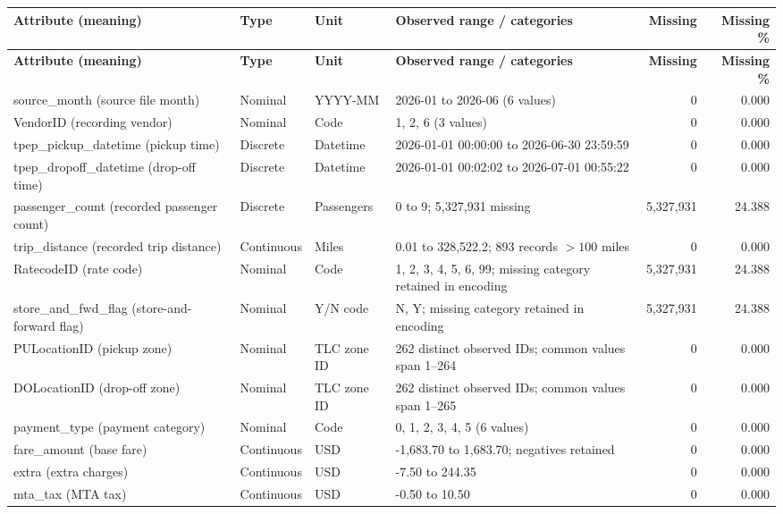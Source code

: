 \documentclass[10pt,a4paper]{article}
\begin{document}
\begin{longtable}{@{}p{3.7cm}p{1.35cm}p{1.25cm}p{6.0cm}r r@{}}
\toprule
\textbf{Attribute (meaning)} & \textbf{Type} & \textbf{Unit} & \textbf{Observed range / categories} & \textbf{Missing} & \textbf{Missing \%}\\
\midrule
\endfirsthead
\toprule
\textbf{Attribute (meaning)} & \textbf{Type} & \textbf{Unit} & \textbf{Observed range / categories} & \textbf{Missing} & \textbf{Missing \%}\\
\midrule
\endhead
\bottomrule
\endfoot
source\_month (source file month) & Nominal & YYYY-MM & 2026-01 to 2026-06 (6 values) & 0 & 0.000\\
VendorID (recording vendor) & Nominal & Code & 1, 2, 6 (3 values) & 0 & 0.000\\
tpep\_pickup\_datetime (pickup time) & Discrete & Datetime & 2026-01-01 00:00:00 to 2026-06-30 23:59:59 & 0 & 0.000\\
tpep\_dropoff\_datetime (drop-off time) & Discrete & Datetime & 2026-01-01 00:02:02 to 2026-07-01 00:55:22 & 0 & 0.000\\
passenger\_count (recorded passenger count) & Discrete & Passengers & 0 to 9; 5,327,931 missing & 5,327,931 & 24.388\\
trip\_distance (recorded trip distance) & Continuous & Miles & 0.01 to 328,522.2; 893 records $>100$ miles & 0 & 0.000\\
RatecodeID (rate code) & Nominal & Code & 1, 2, 3, 4, 5, 6, 99; missing category retained in encoding & 5,327,931 & 24.388\\
store\_and\_fwd\_flag (store-and-forward flag) & Nominal & Y/N code & N, Y; missing category retained in encoding & 5,327,931 & 24.388\\
PULocationID (pickup zone) & Nominal & TLC zone ID & 262 distinct observed IDs; common values span 1--264 & 0 & 0.000\\
DOLocationID (drop-off zone) & Nominal & TLC zone ID & 262 distinct observed IDs; common values span 1--265 & 0 & 0.000\\
payment\_type (payment category) & Nominal & Code & 0, 1, 2, 3, 4, 5 (6 values) & 0 & 0.000\\
fare\_amount (base fare) & Continuous & USD & -1,683.70 to 1,683.70; negatives retained & 0 & 0.000\\
extra (extra charges) & Continuous & USD & -7.50 to 244.35 & 0 & 0.000\\
mta\_tax (MTA tax) & Continuous & USD & -0.50 to 10.50 & 0 & 0.000\\

\end{longtable}
\end{document}
